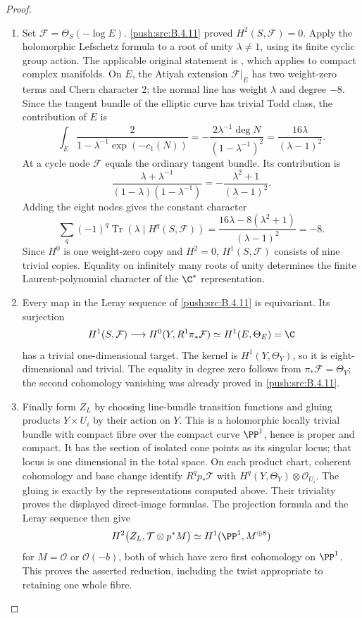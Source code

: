 \begin{proof}
\begin{enumerate}[label=\arabic*.,leftmargin=*]
\item Set $\mathcal F=\Theta_S(-\log E)$.
\ref{push:src:B.4.11} proved $H^2(S,\mathcal F)=0$.
Apply the holomorphic Lefschetz formula to a root of unity
$\lambda\ne1$, using its finite cyclic group action.
The applicable original statement is
\citet[Theorem~(4.6), p.~566]{AtiyahSinger1968IIIE}, which applies
to compact complex manifolds.
On $E$, the Atiyah extension $\mathcal F|_E$ has two
weight-zero terms and Chern character $2$; the normal line
has weight $\lambda$ and degree $-8$.
Since the tangent bundle of the elliptic curve has trivial
Todd class, the contribution of $E$ is
\[
 \int_E\frac{2}{1-\lambda^{-1}\exp(-c_1(N))}
   =-\frac{2\lambda^{-1}\deg N}
           {(1-\lambda^{-1})^2}
   =\frac{16\lambda}{(\lambda-1)^2}.
\]
At a cycle node $\mathcal F$ equals the ordinary tangent
bundle.  Its contribution is
\[
 \frac{\lambda+\lambda^{-1}}
      {(1-\lambda)(1-\lambda^{-1})}
   =-\frac{\lambda^2+1}{(\lambda-1)^2}.
\]
Adding the eight nodes gives the constant character
\[
 \sum_q(-1)^q\operatorname{Tr}
       (\lambda\mid H^q(S,\mathcal F))
 =\frac{16\lambda-8(\lambda^2+1)}{(\lambda-1)^2}
 =-8.
\]
Since $H^0$ is one weight-zero copy and $H^2=0$,
$H^1(S,\mathcal F)$ consists of nine trivial copies.
Equality on infinitely many roots of unity determines the
finite Laurent-polynomial character of the $\C^*$ representation.

\item Every map in the Leray sequence of \ref{push:src:B.4.11} is equivariant.
Its surjection
\[
 H^1(S,\mathcal F)\longrightarrow
 H^0(Y,R^1\pi_*\mathcal F)
       \simeq H^1(E,\Theta_E)=\C
\]
has a trivial one-dimensional target.
The kernel is $H^1(Y,\Theta_Y)$, so it is eight-dimensional
and trivial.  The equality in degree zero follows from
$\pi_*\mathcal F=\Theta_Y$; the second cohomology vanishing
was already proved in \ref{push:src:B.4.11}.

\item Finally form $Z_L$ by choosing line-bundle transition functions
and gluing products $Y\times U_i$ by their action on $Y$.
This is a holomorphic locally trivial bundle with compact
fibre over the compact curve $\PP^1$, hence is proper and
compact.  It has the section of isolated cone points as its
singular locus; that locus is one dimensional in the total
space.  On each product chart, coherent cohomology and base
change identify $R^qp_*\mathcal T$ with
$H^q(Y,\Theta_Y)\otimes\mathcal O_{U_i}$.
The gluing is exactly by the representations computed above.
Their triviality proves the displayed direct-image formulas.
The projection formula and the Leray sequence then give
\[
 H^2\bigl(Z_L,\mathcal T\otimes p^*M\bigr)
      \simeq H^1(\PP^1,M^{\oplus8})
\]
for $M=\mathcal O$ or $\mathcal O(-b)$, both of which have
zero first cohomology on $\PP^1$.
This proves the asserted reduction, including the twist
appropriate to retaining one whole fibre.

\end{enumerate}
\end{proof}
